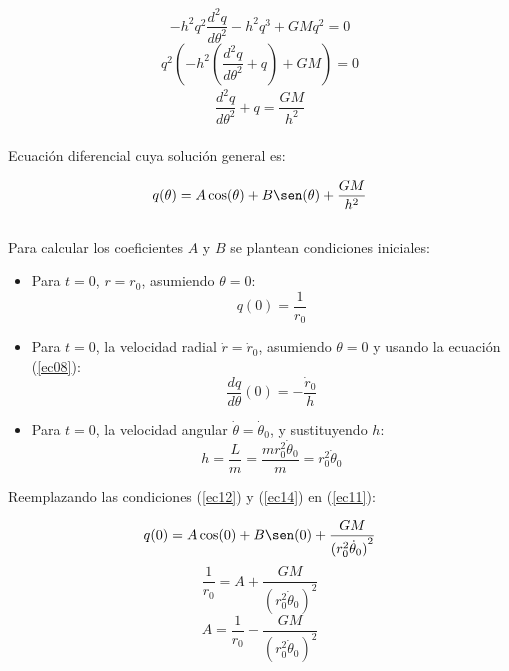 \documentclass[letter,11pt]{article}
\begin{document}
\begin{equation*}
    -h^2q^2\frac{d^2q}{d\theta^2}-h^2q^3+GMq^2=0
\end{equation*}
\begin{equation*}
    q^2\left(-h^2\left(\frac{d^2q}{d\theta^2}+q\right)+GM\right)=0
\end{equation*}
\begin{equation}
\boxed{\begin{array}{l}
    \dfrac{d^2q}{d\theta^2}+q=\dfrac{GM}{h^2}
\end{array}}
\label{ec10}
\end{equation}
\\

Ecuación diferencial cuya solución general es:

\begin{equation}
    q(\theta)=A\cos(\theta)+B\sen(\theta)+\frac{GM}{h^2}
    \label{ec11}
\end{equation}
\\

Para calcular los coeficientes $A$ y $B$ se plantean condiciones iniciales:

\begin{itemize}
\item Para $t=0$, $r=r_0$, asumiendo $\theta=0$:
    \begin{equation}
        q(0)=\frac{1}{r_0}
        \label{ec12}
    \end{equation}
\item Para $t=0$, la velocidad radial $\dot{r}=\dot{r}_0$, asumiendo $\theta=0$
y usando la ecuación (\ref{ec08}):
    \begin{equation}
        \frac{dq}{d\theta}(0)=-\frac{\dot{r}_0}{h}
        \label{ec13}
    \end{equation}
\item Para $t=0$, la velocidad angular $\dot{\theta}=\dot{\theta}_0$, y
sustituyendo $h$:
    \begin{equation}
        h=\frac{L}{m}=\frac{mr^2_0\dot{\theta}_0}{m}=r^2_0\dot{\theta}_0
        \label{ec14}
    \end{equation}
\end{itemize}

Reemplazando las condiciones (\ref{ec12}) y (\ref{ec14}) en (\ref{ec11}):

\begin{equation*}
    q(0)=A\cos(0)+B\sen(0)+\frac{GM}{{(r^2_0\dot{\theta}_0)}^2}
\end{equation*}
\begin{equation*}
    \frac{1}{r_0}=A+\frac{GM}{{(r^2_0\dot{\theta}_0)}^2}
\end{equation*}
\begin{equation}
    A=\frac{1}{r_0}-\frac{GM}{{(r^2_0\dot{\theta}_0)}^2}
    \label{ec15}
\end{equation}
\end{document}
